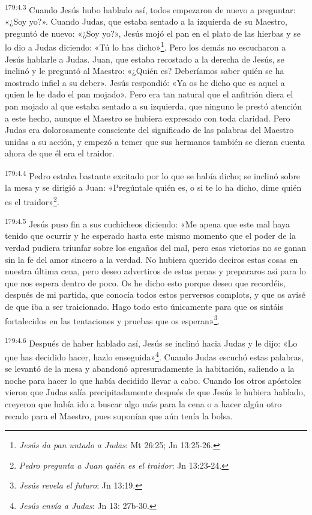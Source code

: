 \par
\textsuperscript{179:4.3} Cuando Jesús hubo hablado así, todos empezaron de nuevo a preguntar: «¿Soy yo?». Cuando Judas, que estaba sentado a la izquierda de su Maestro, preguntó de nuevo: «¿Soy yo?», Jesús mojó el pan en el plato de las hierbas y se lo dio a Judas diciendo: «Tú lo has dicho»\footnote{\textit{Jesús da pan untado a Judas}: Mt 26:25; Jn 13:25-26.}. Pero los demás no escucharon a Jesús hablarle a Judas. Juan, que estaba recostado a la derecha de Jesús, se inclinó y le preguntó al Maestro: «¿Quién es? Deberíamos saber quién se ha mostrado infiel a su deber». Jesús respondió: «Ya os he dicho que es aquel a quien le he dado el pan mojado». Pero era tan natural que el anfitrión diera el pan mojado al que estaba sentado a su izquierda, que ninguno le prestó atención a este hecho, aunque el Maestro se hubiera expresado con toda claridad. Pero Judas era dolorosamente consciente del significado de las palabras del Maestro unidas a su acción, y empezó a temer que sus hermanos también se dieran cuenta ahora de que él era el traidor.

\par
\textsuperscript{179:4.4} Pedro estaba bastante excitado por lo que se había dicho; se inclinó sobre la mesa y se dirigió a Juan: «Pregúntale quién es, o si te lo ha dicho, dime quién es el traidor»\footnote{\textit{Pedro pregunta a Juan quién es el traidor}: Jn 13:23-24.}.

\par
\textsuperscript{179:4.5} Jesús puso fin a sus cuchicheos diciendo: «Me apena que este mal haya tenido que ocurrir y he esperado hasta este mismo momento que el poder de la verdad pudiera triunfar sobre los engaños del mal, pero esas victorias no se ganan sin la fe del amor sincero a la verdad. No hubiera querido deciros estas cosas en nuestra última cena, pero deseo advertiros de estas penas y prepararos así para lo que nos espera dentro de poco. Os he dicho esto porque deseo que recordéis, después de mi partida, que conocía todos estos perversos complots, y que os avisé de que iba a ser traicionado. Hago todo esto únicamente para que os sintáis fortalecidos en las tentaciones y pruebas que os esperan»\footnote{\textit{Jesús revela el futuro}: Jn 13:19.}.

\par
\textsuperscript{179:4.6} Después de haber hablado así, Jesús se inclinó hacia Judas y le dijo: «Lo que has decidido hacer, hazlo enseguida»\footnote{\textit{Jesús envía a Judas}: Jn 13: 27b-30.}. Cuando Judas escuchó estas palabras, se levantó de la mesa y abandonó apresuradamente la habitación, saliendo a la noche para hacer lo que había decidido llevar a cabo. Cuando los otros apóstoles vieron que Judas salía precipitadamente después de que Jesús le hubiera hablado, creyeron que había ido a buscar algo más para la cena o a hacer algún otro recado para el Maestro, pues suponían que aún tenía la bolsa.

